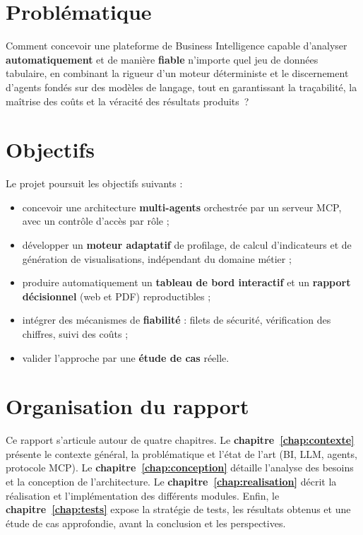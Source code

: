 \section*{Problématique}
Comment concevoir une plateforme de Business Intelligence capable d'analyser
\textbf{automatiquement} et de manière \textbf{fiable} n'importe quel jeu de
données tabulaire, en combinant la rigueur d'un moteur déterministe et le
discernement d'agents fondés sur des modèles de langage, tout en garantissant
la traçabilité, la maîtrise des coûts et la véracité des résultats produits~?

\section*{Objectifs}
Le projet poursuit les objectifs suivants :
\begin{itemize}
  \item concevoir une architecture \textbf{multi-agents} orchestrée par un
        serveur MCP, avec un contrôle d'accès par rôle ;
  \item développer un \textbf{moteur adaptatif} de profilage, de calcul
        d'indicateurs et de génération de visualisations, indépendant du
        domaine métier ;
  \item produire automatiquement un \textbf{tableau de bord interactif} et un
        \textbf{rapport décisionnel} (web et PDF) reproductibles ;
  \item intégrer des mécanismes de \textbf{fiabilité} : filets de sécurité,
        vérification des chiffres, suivi des coûts ;
  \item valider l'approche par une \textbf{étude de cas} réelle.
\end{itemize}

\section*{Organisation du rapport}
Ce rapport s'articule autour de quatre chapitres. Le
\textbf{chapitre~\ref{chap:contexte}} présente le contexte général, la
problématique et l'état de l'art (BI, LLM, agents, protocole MCP). Le
\textbf{chapitre~\ref{chap:conception}} détaille l'analyse des besoins et la
conception de l'architecture. Le \textbf{chapitre~\ref{chap:realisation}}
décrit la réalisation et l'implémentation des différents modules. Enfin, le
\textbf{chapitre~\ref{chap:tests}} expose la stratégie de tests, les
résultats obtenus et une étude de cas approfondie, avant la conclusion et les
perspectives.
